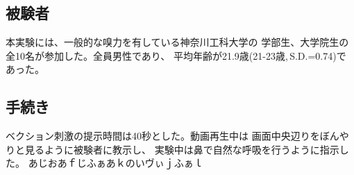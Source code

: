 \documentclass[uplatex]{jsarticle}   %
\begin{document}
\subsection{被験者}
本実験には、一般的な嗅力を有している神奈川工科大学の
学部生、大学院生の全10名が参加した。全員男性であり、
平均年齢が21.9歳(21-23歳,\,S.D.=0.74)であった。

\subsection{手続き}
ベクション刺激の提示時間は40秒とした。動画再生中は
画面中央辺りをぼんやりと見るように被験者に教示し、
実験中は鼻で自然な呼吸を行うように指示した。
あじおあｆじふぁあｋのいヴぃｊふぁｌ





\end{document}

